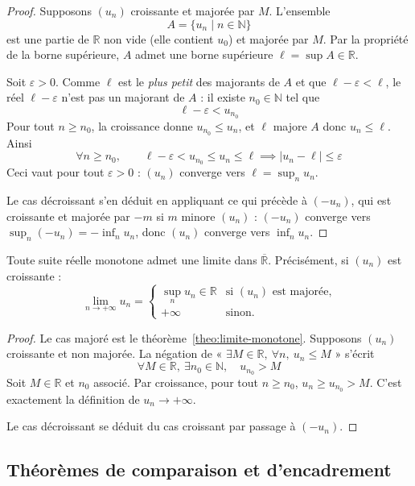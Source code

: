 \begin{proof}
Supposons $(u_n)$ croissante et majorée par $M$. L'ensemble
\[A = \{u_n \mid n\in\mathbb{N}\}\]
est une partie de $\mathbb{R}$ non vide (elle contient $u_0$) et majorée par $M$. Par la propriété de la borne supérieure, $A$ admet une borne supérieure $\ell=\sup A\in\mathbb{R}$.

Soit $\varepsilon>0$. Comme $\ell$ est le \emph{plus petit} des majorants de $A$ et que $\ell-\varepsilon<\ell$, le réel $\ell-\varepsilon$ n'est pas un majorant de $A$ : il existe $n_0\in\mathbb{N}$ tel que
\[\ell-\varepsilon < u_{n_0}\]
Pour tout $n\geq n_0$, la croissance donne $u_{n_0}\leq u_n$, et $\ell$ majore $A$ donc $u_n\leq\ell$. Ainsi
\[\forall n\geq n_0,\qquad \ell-\varepsilon < u_{n_0}\leq u_n\leq\ell \implies |u_n-\ell|\leq\varepsilon\]
Ceci vaut pour tout $\varepsilon>0$ : $(u_n)$ converge vers $\ell=\sup_{n}u_n$.

Le cas décroissant s'en déduit en appliquant ce qui précède à $(-u_n)$, qui est croissante et majorée par $-m$ si $m$ minore $(u_n)$ : $(-u_n)$ converge vers $\sup_n(-u_n)=-\inf_n u_n$, donc $(u_n)$ converge vers $\inf_n u_n$.
\end{proof}

\begin{coro}
\label{coro:limite-monotone-rbar}
Toute suite réelle monotone admet une limite dans $\overline{\mathbb{R}}$. Précisément, si $(u_n)$ est croissante :
\[\lim_{n\to+\infty}u_n = \begin{cases} \sup_{n}u_n\in\mathbb{R} & \text{si } (u_n) \text{ est majorée,}\\[2pt] +\infty & \text{sinon.}\end{cases}\]
\end{coro}

\begin{proof}
Le cas majoré est le théorème~\ref{theo:limite-monotone}. Supposons $(u_n)$ croissante et non majorée. La négation de « $\exists M\in\mathbb{R},\ \forall n,\ u_n\leq M$ » s'écrit
\[\forall M\in\mathbb{R},\ \exists n_0\in\mathbb{N},\quad u_{n_0}>M\]
Soit $M\in\mathbb{R}$ et $n_0$ associé. Par croissance, pour tout $n\geq n_0$, $u_n\geq u_{n_0}>M$. C'est exactement la définition de $u_n\to+\infty$.

Le cas décroissant se déduit du cas croissant par passage à $(-u_n)$.
\end{proof}

\subsection{Théorèmes de comparaison et d'encadrement}

